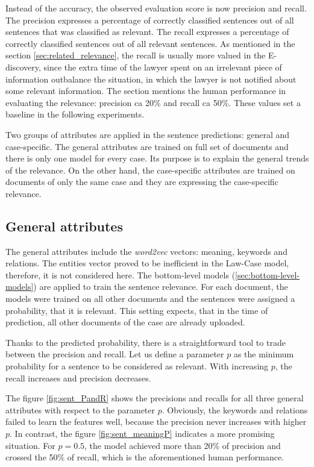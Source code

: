 \documentclass[
  digital, %
  notable,   %
  nolof,     %
  nolot,     %
]{fithesis3}
\begin{document}
Instead of the accuracy, the observed evaluation score is now precision and recall.
The precision expresses a percentage of correctly classified sentences out of all sentences that was classified as relevant.
The recall expresses a percentage of correctly classified sentences out of all relevant sentences.
As mentioned in the section \ref{sec:related_relevance}, the recall is usually more valued in the E-discovery, since the extra time of the lawyer spent on an irrelevant piece of information outbalance the situation, in which the lawyer is not notified about some relevant information.
The section mentions the human performance in evaluating the relevance: precision ca 20\% and recall ca 50\%.
These values set a baseline in the following experiments.

Two groups of attributes are applied in the sentence predictions: general and case-specific. 
The general attributes are trained on full set of documents and there is only one model for every case.
Its purpose is to explain the general trends of the relevance.
On the other hand, the case-specific attributes are trained on documents of only the same case and they are expressing the case-specific relevance.

\subsection{General attributes}
The general attributes include the \textit{word2vec} vectors: meaning, keywords and relations.
The entities vector proved to be inefficient in the Law-Case model, therefore, it is not considered here.
The bottom-level models (\ref{sec:bottom-level-models}) are applied to train the sentence relevance.
For each document, the models were trained on all other documents and the sentences were assigned a probability, that it is relevant.
This setting expects, that in the time of prediction, all other documents of the case are already uploaded.

Thanks to the predicted probability, there is a straightforward tool to trade between the precision and recall.
Let us define a parameter $p$ as the minimum probability for a sentence to be considered as relevant.
With increasing $p$, the recall increases and precision decreases.

The figure \ref{fig:sent_PandR} shows the precisions and recalls for all three general attributes with respect to the parameter $p$.
Obviously, the keywords and relations failed to learn the features well, because the precision never increases with higher $p$.
In contrast, the figure \ref{fig:sent_meaningP} indicates a more promising situation.
For $p=0.5$, the model achieved more than 20\% of precision and crossed the 50\% of recall, which is the aforementioned human performance.
\end{document}
